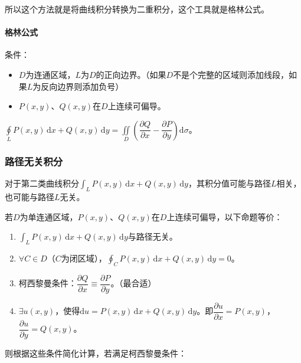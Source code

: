 \documentclass[UTF8, 12pt]{ctexart}
\begin{document}
        所以这个方法就是将曲线积分转换为二重积分，这个工具就是格林公式。

        \paragraph{格林公式} \leavevmode \medskip

        条件：

        \begin{itemize}
            \item $D$为连通区域，$L$为$D$的正向边界。（如果$D$不是个完整的区域则添加线段，如果$L$为反向边界则添加负号）
            \item $P(x,y)$、$Q(x,y)$在$D$上连续可偏导。
        \end{itemize}

        $\displaystyle{\oint\limits_LP(x,y)\,\textrm{d}x+Q(x,y)\,\textrm{d}y=\iint\limits_D\left(\dfrac{\partial Q}{\partial x}-\dfrac{\partial P}{\partial y}\right)\textrm{d}\sigma}$。

        \subsubsection{路径无关积分}

        对于第二类曲线积分$\int_LP(x,y)\,\textrm{d}x+Q(x,y)\,\textrm{d}y$，其积分值可能与路径$L$相关，也可能与路径$L$无关。

        若$D$为单连通区域，$P(x,y)$、$Q(x,y)$在$D$上连续可偏导，以下命题等价：

        \begin{enumerate}
            \item $\int_LP(x,y)\,\textrm{d}x+Q(x,y)\,\textrm{d}y$与路径无关。
            \item $\forall C\in D$（$C$为闭区域），$\oint_CP(x,y)\,\textrm{d}x+Q(x,y)\,\textrm{d}y=0$。
            \item 柯西黎曼条件：$\dfrac{\partial Q}{\partial x}\equiv\dfrac{\partial P}{\partial y}$。（最合适）
            \item $\exists u(x,y)$，使得$\textrm{d}u=P(x,y)\,\textrm{d}x+Q(x,y)\,\textrm{d}y$。即$\dfrac{\partial u}{\partial x}=P(x,y)$，$\dfrac{\partial u}{\partial y}=Q(x,y)$。
        \end{enumerate}

        则根据这些条件简化计算，若满足柯西黎曼条件：
\end{document}
